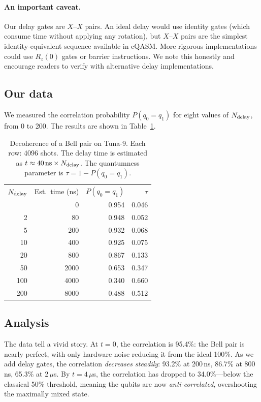 \documentclass[amsmath,amssymb,reprint,aps,prb]{revtex4-2}
\begin{document}
\paragraph{An important caveat.}  Our delay gates are $X$--$X$
pairs.  An ideal delay would use identity gates (which consume
time without applying any rotation), but $X$--$X$ pairs are the
simplest identity-equivalent sequence available in cQASM.  More
rigorous implementations could use $R_z(0)$ gates or barrier
instructions.  We note this honestly and encourage readers to
verify with alternative delay implementations.

\subsection{Our data}

We measured the correlation probability $P(q_0 = q_1)$ for eight
values of $N_{\rm delay}$, from 0 to 200.  The results are shown
in Table~\ref{tab:decoherence}.

\begin{table}[t]
\caption{\label{tab:decoherence}Decoherence of a Bell pair on
Tuna-9.  Each row: 4096 shots.  The delay time is estimated as
$t \approx 40\,\text{ns} \times N_{\rm delay}$.  The quantumness
parameter is $\tau = 1 - P(q_0 {=} q_1)$.}
\begin{ruledtabular}
\begin{tabular}{rrrr}
$N_{\rm delay}$ & Est.\ time (ns) & $P(q_0{=}q_1)$ & $\tau$ \\
\colrule
0   &      0 & 0.954 & 0.046 \\
2   &     80 & 0.948 & 0.052 \\
5   &    200 & 0.932 & 0.068 \\
10  &    400 & 0.925 & 0.075 \\
20  &    800 & 0.867 & 0.133 \\
50  &   2000 & 0.653 & 0.347 \\
100 &   4000 & 0.340 & 0.660 \\
200 &   8000 & 0.488 & 0.512 \\
\end{tabular}
\end{ruledtabular}
\end{table}

\subsection{Analysis}

The data tell a vivid story.  At $t = 0$, the correlation is 95.4\%:
the Bell pair is nearly perfect, with only hardware noise
reducing it from the ideal 100\%.  As we add delay gates,
the correlation \emph{decreases steadily}: 93.2\% at 200\,ns,
86.7\% at 800\,ns, 65.3\% at 2\,$\mu$s.  By $t = 4\,\mu$s, the
correlation has dropped to 34.0\%---below the classical 50\%
threshold, meaning the qubits are now \emph{anti-correlated},
overshooting the maximally mixed state.
\end{document}

